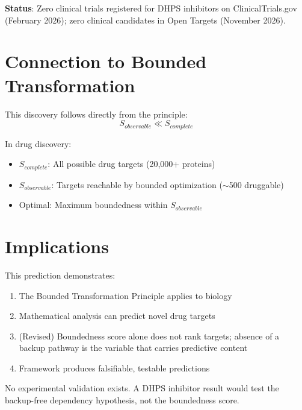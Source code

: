 \documentclass[11pt]{article}
\begin{document}
\textbf{Status}: Zero clinical trials registered for DHPS inhibitors on ClinicalTrials.gov (February 2026); zero clinical candidates in Open Targets (November 2026).

\section{Connection to Bounded Transformation}

This discovery follows directly from the principle:
$$S_{observable} \ll S_{complete}$$

In drug discovery:
\begin{itemize}
\item $S_{complete}$: All possible drug targets (20,000+ proteins)
\item $S_{observable}$: Targets reachable by bounded optimization ($\sim$500 druggable)
\item Optimal: Maximum boundedness within $S_{observable}$
\end{itemize}

\section{Implications}

This prediction demonstrates:
\begin{enumerate}
\item The Bounded Transformation Principle applies to biology
\item Mathematical analysis can predict novel drug targets
\item (Revised) Boundedness score alone does not rank targets; absence of a backup pathway is the variable that carries predictive content
\item Framework produces falsifiable, testable predictions
\end{enumerate}

No experimental validation exists. A DHPS inhibitor result would test the backup-free dependency hypothesis, not the boundedness score.
\end{document}
